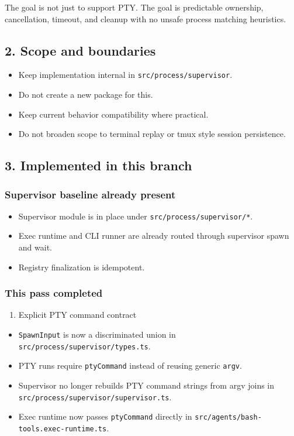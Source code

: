 The goal is not just to support PTY. The goal is predictable ownership, cancellation, timeout, and cleanup with no unsafe process matching heuristics.

\subsection{2. Scope and boundaries}


\begin{itemize}
  \item Keep implementation internal in \texttt{src/process/supervisor}.
  \item Do not create a new package for this.
  \item Keep current behavior compatibility where practical.
  \item Do not broaden scope to terminal replay or tmux style session persistence.
\end{itemize}


\subsection{3. Implemented in this branch}


\subsubsection{Supervisor baseline already present}


\begin{itemize}
  \item Supervisor module is in place under \texttt{src/process/supervisor/*}.
  \item Exec runtime and CLI runner are already routed through supervisor spawn and wait.
  \item Registry finalization is idempotent.
\end{itemize}


\subsubsection{This pass completed}


\begin{enumerate}
  \item Explicit PTY command contract
\end{enumerate}


\begin{itemize}
  \item \texttt{SpawnInput} is now a discriminated union in \texttt{src/process/supervisor/types.ts}.
  \item PTY runs require \texttt{ptyCommand} instead of reusing generic \texttt{argv}.
  \item Supervisor no longer rebuilds PTY command strings from argv joins in \texttt{src/process/supervisor/supervisor.ts}.
  \item Exec runtime now passes \texttt{ptyCommand} directly in \texttt{src/agents/bash-tools.exec-runtime.ts}.
\end{itemize}



